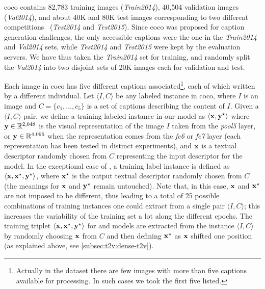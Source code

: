 \sloppy \gls{coco} contains 82,783 training images (\emph{Train2014}), 40,504 validation images (\emph{Val2014}), and about 40K and 80K test images corresponding to two different competitions~\cite{chen2015microsoft} (\emph{Test2014} and \emph{Test2015}).
Since \gls{coco} was proposed for caption generation challenges, the only accessible captions were the one in the \emph{Train2014} and \emph{Val2014} sets, while \emph{Test2014} and \emph{Test2015} were kept by the evaluation servers.
We have thus taken the \emph{Train2014} set for training, and randomly split the \emph{Val2014} into two disjoint sets of 20K images each for validation and test.

Each image in \gls{coco} has five different captions associated\footnote{Actually in the dataset there are few images with more than five captions available for processing. In such cases we took the first five listed.}, each of which written by a different individual.
Let $\langle I, C \rangle$ be any labeled instance in \gls{coco}, where $I$ is an image and $C = \{ c_1, \ldots, c_5\}$ is a set of captions describing the content of $I$.
Given a $\langle I, C \rangle$ pair, we define a training labeled instance in our model as $\left \langle \mathbf{x},\mathbf{y}^\star \right \rangle$ where $\mathbf{y} \in \mathbb{R}^{2,048}$ is the visual representation of the image $I$ taken from the \emph{pool5} layer, or $\mathbf{y} \in \mathbb{R}^{4,096}$ when the representation comes from the \emph{fc6} or \emph{fc7} layer (each representation has been tested in distinct experiments), and $\mathbf{x}$ is a textual descriptor randomly chosen from $C$ representing the input descriptor for the model.
In the exceptional case of \sparsettv{}, a training label instance is defined as $\left \langle \mathbf{x}, \mathbf{x}^\star, \mathbf{y}^\star \right \rangle$, where $\mathbf{x}^\star$ is the output textual descriptor randomly chosen from $C$ (the meanings for $\mathbf{x}$ and $\mathbf{y}^\star$ remain untouched).
Note that, in this case, $\mathbf{x}$ and $\mathbf{x}^\star$ are not imposed to be different, thus leading to a total of 25 possible combinations of training instances one could extract from a single pair $\langle I, C \rangle$;
this increases the variability of the training set a lot along the different epochs.
The training triplet $\langle \mathbf{x}, \mathbf{x}^\star, \mathbf{y}^\star \rangle$ for \densettv{} and \widedeepttv{} models are extracted from the instance $\langle I, C \rangle$ by randomly choosing $\mathbf{x}$ from $C$ and then defining $\mathbf{x}^\star$ as $\mathbf{x}$ shifted one position (as explained above, see \ref{subsec:t2v:dense-t2v}).

